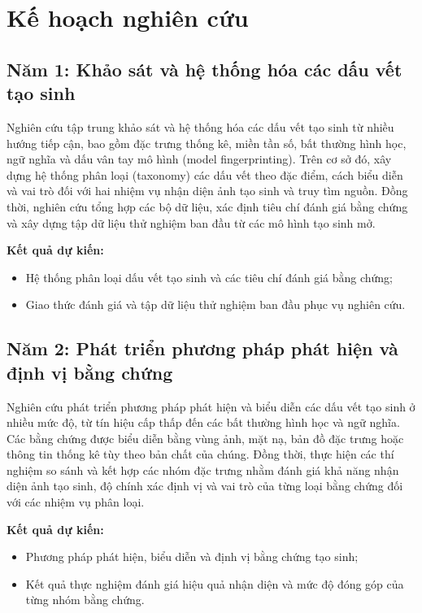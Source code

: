 \documentclass[12pt]{report}
\begin{document}
\section{Kế hoạch nghiên cứu}
\label{sec:plan}

\subsection{Năm 1: Khảo sát và hệ thống hóa các dấu vết tạo sinh}

Nghiên cứu tập trung khảo sát và hệ thống hóa các dấu vết tạo sinh từ nhiều hướng tiếp cận, bao gồm đặc trưng thống kê, miền tần số, bất thường hình học, ngữ nghĩa và dấu vân tay mô hình (model fingerprinting). Trên cơ sở đó, xây dựng hệ thống phân loại (taxonomy) các dấu vết theo đặc điểm, cách biểu diễn và vai trò đối với hai nhiệm vụ nhận diện ảnh tạo sinh và truy tìm nguồn. Đồng thời, nghiên cứu tổng hợp các bộ dữ liệu, xác định tiêu chí đánh giá bằng chứng và xây dựng tập dữ liệu thử nghiệm ban đầu từ các mô hình tạo sinh mở.

\textbf{Kết quả dự kiến:}
\begin{itemize}
    \item Hệ thống phân loại dấu vết tạo sinh và các tiêu chí đánh giá bằng chứng;
    \item Giao thức đánh giá và tập dữ liệu thử nghiệm ban đầu phục vụ nghiên cứu.
\end{itemize}

\subsection{Năm 2: Phát triển phương pháp phát hiện và định vị bằng chứng}

Nghiên cứu phát triển phương pháp phát hiện và biểu diễn các dấu vết tạo sinh ở nhiều mức độ, từ tín hiệu cấp thấp đến các bất thường hình học và ngữ nghĩa. Các bằng chứng được biểu diễn bằng vùng ảnh, mặt nạ, bản đồ đặc trưng hoặc thông tin thống kê tùy theo bản chất của chúng. Đồng thời, thực hiện các thí nghiệm so sánh và kết hợp các nhóm đặc trưng nhằm đánh giá khả năng nhận diện ảnh tạo sinh, độ chính xác định vị và vai trò của từng loại bằng chứng đối với các nhiệm vụ phân loại.

\textbf{Kết quả dự kiến:}
\begin{itemize}
    \item Phương pháp phát hiện, biểu diễn và định vị bằng chứng tạo sinh;
    \item Kết quả thực nghiệm đánh giá hiệu quả nhận diện và mức độ đóng góp của từng nhóm bằng chứng.
\end{itemize}
\end{document}
